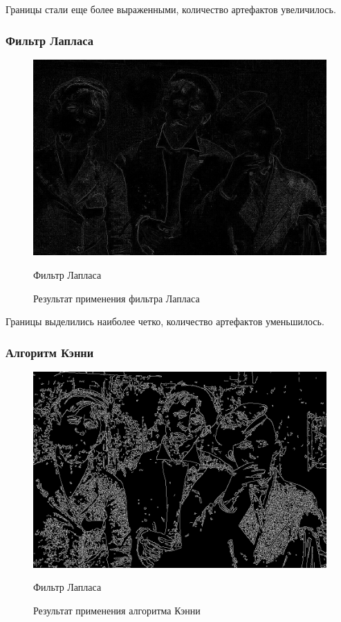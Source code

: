 Границы стали еще более выраженными, количество артефактов увеличилось. 

\subsubsection{Фильтр Лапласа}

\begin{figure}[ht!]
  \centering
  \includegraphics[width=\textwidth]{../Edge_Detection/Laplassian_Smoking_boys.jpg}
  \caption{Фильтр Лапласа}
  \caption{Результат применения фильтра Лапласа}
  \label{img:laplassian}  
\end{figure}
\FloatBarrier

Границы выделились наиболее четко, количество артефактов уменьшилось.

\subsubsection{Алгоритм Кэнни}
\begin{figure}[ht!]
  \centering
  \includegraphics[width=\textwidth]{../Edge_Detection/Canny_Smoking_boys.jpg}
  \caption{Фильтр Лапласа}
  \caption{Результат применения алгоритма Кэнни}
  \label{img:canny}  
\end{figure}
\FloatBarrier


